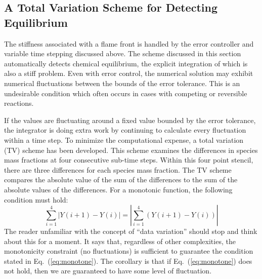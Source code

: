 \subsection*{A Total Variation Scheme for Detecting Equilibrium}

The stiffness associated with a flame front is handled by the error controller and variable time stepping discussed above. The scheme discussed in this section automatically detects chemical equilibrium, the explicit integration of which is also a stiff problem.  Even with error control, the numerical solution may exhibit numerical fluctuations between the bounds of the error tolerance.  This is an undesirable condition which often occurs in cases with competing or reversible reactions.

If the values are fluctuating around a fixed value bounded by the error tolerance, the integrator is doing extra work by continuing to calculate every fluctuation within a time step. To minimize the computational expense, a total variation (TV) scheme has been developed. This scheme examines the differences in species mass fractions at four consecutive sub-time steps. Within this four point stencil, there are three differences for each species mass fraction. The TV scheme compares the absolute value of the sum of the differences to the sum of the absolute values of the differences.  For a monotonic function, the following condition must hold:
\begin{equation}\label{eq:monotone}
\sum_{i=1}^{4}|Y(i+1)-Y(i)| = |\sum_{i=1}^{4}(Y(i+1)-Y(i))|
\end{equation}
The reader unfamiliar with the concept of ``data variation'' should stop and think about this for a moment.  It says that, regardless of other complexities, the monotonicity constraint (no fluctuations) is sufficient to guarantee the condition stated in Eq.~(\ref{eq:monotone}).  The corollary is that if Eq.~(\ref{eq:monotone}) does not hold, then we are guaranteed to have some level of fluctuation.

